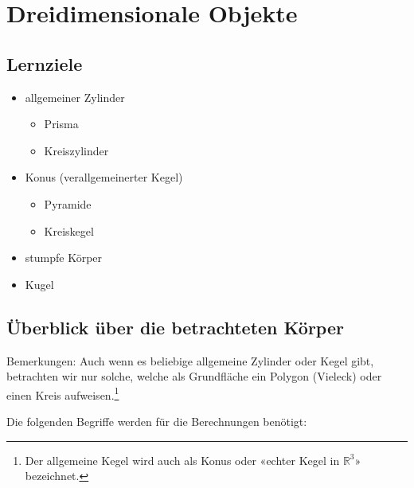 \section{Dreidimensionale Objekte}


\subsection*{Lernziele}
\begin{itemize}
\item allgemeiner Zylinder
  \begin{itemize}
  \item Prisma
  \item Kreiszylinder
    \end{itemize}
\item Konus (verallgemeinerter Kegel)
  \begin{itemize}
  \item Pyramide
  \item Kreiskegel
  \end{itemize}
  \item stumpfe Körper
  \item Kugel
\end{itemize}
\newpage
\subsection{Überblick über die betrachteten Körper}


Bemerkungen: Auch wenn es beliebige allgemeine Zylinder oder Kegel
gibt, betrachten wir nur solche, welche als Grundfläche ein Polygon
(Vieleck) oder einen Kreis aufweisen.\footnote{Der allgemeine Kegel wird auch als Konus oder «echter Kegel in $\mathbb{R}^3$» bezeichnet.}

Die folgenden Begriffe werden für die Berechnungen benötigt:


